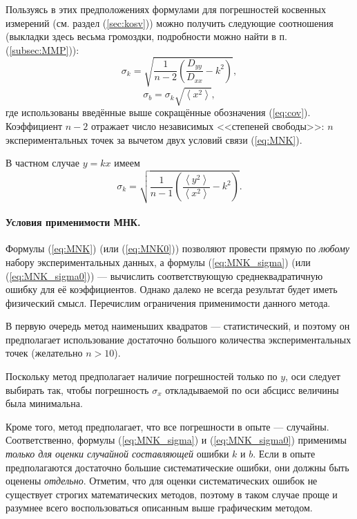 \documentclass[10pt]{article}
\begin{document}
Пользуясь в этих предположениях формулами для погрешностей косвенных
измерений (см. раздел (\ref{sec:kosv})) можно получить следующие
соотношения (выкладки здесь весьма громоздки, подробности можно найти
в п. (\ref{subsec:MMP})):
\begin{equation}
\sigma_{k}=\sqrt{\frac{1}{n-2}\left(\frac{D_{yy}}{D_{xx}}-k^{2}\right)},\label{eq:MNK_sigma}
\end{equation}
\begin{equation}
\sigma_{b}=\sigma_{k}\sqrt{\left\langle x^{2}\right\rangle },\label{eq:MNK_sigma_b}
\end{equation}
где использованы введённые выше сокращённые обозначения (\ref{eq:cov}).
Коэффициент $n-2$ отражает число независимых <<степеней
свободы>>: $n$ экспериментальных точек за вычетом двух
условий связи (\ref{eq:MNK}).

В частном случае $y=kx$ имеем
\begin{equation}
\sigma_{k}=\sqrt{\frac{1}{n-1}\left(\frac{\left\langle y^{2}\right\rangle }{\left\langle x^{2}\right\rangle }-k^{2}\right)}.\label{eq:MNK_sigma0}
\end{equation}


\paragraph{Условия применимости МНК.}

Формулы (\ref{eq:MNK}) (или (\ref{eq:MNK0})) позволяют провести
прямую по \emph{любому} набору экспериментальных данных, а формулы
(\ref{eq:MNK_sigma}) (или (\ref{eq:MNK_sigma0})) --- вычислить
соответствующую среднеквадратичную ошибку для её коэффициентов. Однако
далеко не всегда результат будет иметь физический смысл. Перечислим
ограничения применимости данного метода.

В первую очередь метод наименьших квадратов --- статистический,
и поэтому он предполагает использование достаточно большого количества
экспериментальных точек (желательно $n>10$).

Поскольку метод предполагает наличие погрешностей только по $y$,
оси следует выбирать так, чтобы погрешность $\sigma_{x}$ откладываемой
по оси абсцисс величины была минимальна.

Кроме того, метод предполагает, что все погрешности в опыте ---
случайны. Соответственно, формулы (\ref{eq:MNK_sigma}) и (\ref{eq:MNK_sigma0})
применимы \emph{только для оценки случайной составляющей} ошибки $k$
и $b$. Если в опыте предполагаются достаточно большие систематические
ошибки, они должны быть оценены \emph{отдельно}. Отметим, что для
оценки систематических ошибок не существует строгих математических
методов, поэтому в таком случае проще и разумнее всего воспользоваться
описанным выше графическим методом.
\end{document}
